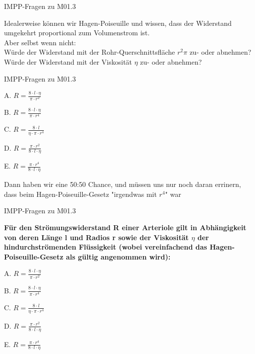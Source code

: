 \documentclass{beamer}
\begin{document}
\begin{frame}{IMPP-Fragen zu M01.3}

Idealerweise können wir Hagen-Poiseuille und wissen, dass der Widerstand umgekehrt proportional zum Volumenstrom ist. \\

Aber selbst wenn nicht:  \\
  
Würde der Widerstand mit der Rohr-Querschnittsfläche \(r^2 \pi\) zu- oder abnehmen? \\
Würde der Widerstand mit der Viskosität \(\eta\) zu- oder abnehmen? 

\end{frame}

\begin{frame}{IMPP-Fragen zu M01.3}

\begin{description}
\item{A.}
\(R=\frac{8\cdot l\cdot \eta}{\pi \cdot r^2}\)
\item{B.}
\(R=\frac{8\cdot l\cdot \eta}{\pi \cdot r^4}\)  %
\item{C.}
\sout{\(R=\frac{8\cdot l}{\eta \cdot \pi  \cdot r^4}\)}
\item{D.}
\sout{\(R=\frac{\pi \cdot r^2}{8\cdot l \cdot \eta}\)}
\item{E.}
\sout{\(R=\frac{\pi\cdot r^4}{8\cdot l \cdot \eta}\)} \\[0.2 cm]
\end{description}


\pause
Dann haben wir eine 50:50 Chance, und müssen uns nur noch daran errinern, dass beim Hagen-Poiseuille-Gesetz "irgendwas mit \(r^4\)" war

\end{frame}


\begin{frame}{IMPP-Fragen zu M01.3}


    \textbf{
    Für den Strömungswiderstand R einer Arteriole gilt in Abhängigkeit von deren Länge l und Radios r sowie der Viskosität \(\eta\) der hindurchströmenden Flüssigkeit (wobei vereinfachend das Hagen-Poiseuille-Gesetz als gültig angenommen wird):
    } \\[0.2 cm]

\begin{description}
\item{A.}
\sout{\(R=\frac{8\cdot l\cdot \eta}{\pi \cdot r^2}\)}
\item{B.}
\textcolor{theme}{\(R=\frac{8\cdot l\cdot \eta}{\pi \cdot r^4}\) } %
\item{C.}
\sout{\(R=\frac{8\cdot l}{\eta \cdot \pi  \cdot r^4}\)}
\item{D.}
\sout{\(R=\frac{\pi \cdot r^2}{8\cdot l \cdot \eta}\)}
\item{E.}
\sout{\(R=\frac{\pi\cdot r^4}{8\cdot l \cdot \eta}\)}
\end{description}
\end{frame}
\end{document}
